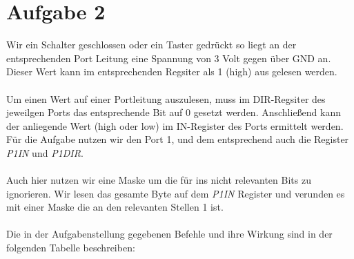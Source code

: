 
\section{Aufgabe 2}

Wir ein Schalter geschlossen oder ein Taster gedrückt so liegt an der entsprechenden Port Leitung eine Spannung von 3 Volt gegen über GND an. Dieser Wert kann im entsprechenden Regsiter als 1 (high) aus gelesen werden.
\paragraph*{}
Um einen Wert auf einer Portleitung auszulesen, muss im DIR-Regsiter des jeweilgen Ports das entsprechende Bit auf 0 gesetzt werden. Anschließend kann der anliegende Wert (high oder low) im IN-Register des Ports ermittelt werden. Für die Aufgabe nutzen wir den Port 1, und dem entsprechend auch die Register {\em P1IN} und {\em P1DIR}.
\paragraph{}
Auch hier nutzen wir eine Maske um die für ins nicht relevanten Bits zu ignorieren. Wir lesen das gesamte Byte auf dem {\em P1IN} Register und verunden es mit einer Maske die an den relevanten Stellen 1 ist.
\paragraph{} Die in der Aufgabenstellung gegebenen Befehle und 
ihre Wirkung sind in der folgenden Tabelle beschreiben:

